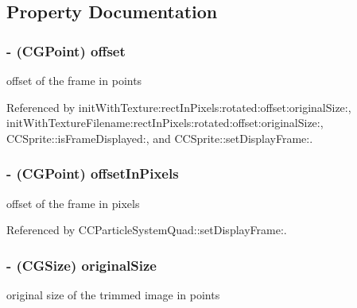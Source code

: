 \subsection{Property Documentation}
\hypertarget{interface_c_c_sprite_frame_a383201c46dfdbc911fe46356e1b86909}{
\subsubsection[{offset}]{\setlength{\rightskip}{0pt plus 5cm}-\/ (C\-G\-Point) {\bf offset}}}\label{interface_c_c_sprite_frame_a383201c46dfdbc911fe46356e1b86909}
offset of the frame in points 

Referenced by init\-With\-Texture\-:rect\-In\-Pixels\-:rotated\-:offset\-:original\-Size\-:, init\-With\-Texture\-Filename\-:rect\-In\-Pixels\-:rotated\-:offset\-:original\-Size\-:, C\-C\-Sprite\-::is\-Frame\-Displayed\-:, and C\-C\-Sprite\-::set\-Display\-Frame\-:.

\hypertarget{interface_c_c_sprite_frame_ac1b194686a75ffafffbc9ea2cc2a4f7c}{
\subsubsection[{offset\-In\-Pixels}]{\setlength{\rightskip}{0pt plus 5cm}-\/ (C\-G\-Point) {\bf offset\-In\-Pixels}}}\label{interface_c_c_sprite_frame_ac1b194686a75ffafffbc9ea2cc2a4f7c}
offset of the frame in pixels 

Referenced by C\-C\-Particle\-System\-Quad\-::set\-Display\-Frame\-:.

\hypertarget{interface_c_c_sprite_frame_a63da85f3fe5646803a2d403896b3c762}{
\subsubsection[{original\-Size}]{\setlength{\rightskip}{0pt plus 5cm}-\/ (C\-G\-Size) {\bf original\-Size}}}\label{interface_c_c_sprite_frame_a63da85f3fe5646803a2d403896b3c762}
original size of the trimmed image in points 

